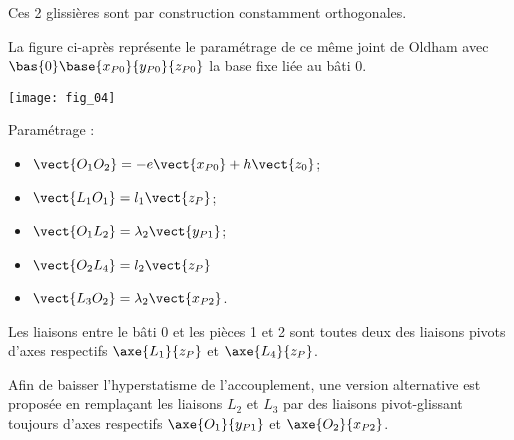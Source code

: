 \begin{multicols}{2}
\begin{multicols}{2}
Ces 2 glissières sont par construction constamment orthogonales.

La figure ci-après représente le paramétrage de ce même joint de Oldham avec $\bas{0}\base{x_{P0}}{y_{P0}}{z_{P0}}$ la base fixe liée au bâti 0.

\begin{center}%
\texttt{[image: fig\_04]}
\end{center}


Paramétrage :
\begin{itemize}
\item $\vect{O_1 O_2} =  - e\vect{x_{P0}} + h \vect{z_0}$;
\item $\vect{L_1 O_1 }=l_1 \vect{z_P}$;
\item $\vect{O_1 L_2 } =\lambda_2 \vect{y_{P1}}$;
\item $\vect{O_2 L_4 } =l_2 \vect{z_P}$
\item $\vect{L_3 O_2} = \lambda_2  \vect{x_{P2}}$.
\end{itemize}

Les liaisons entre le bâti 0 et les pièces 1 et 2 sont toutes deux des liaisons pivots d’axes respectifs
$\axe{L_1}{z_P}$ et $\axe{L_4}{z_P}$.






Afin de baisser l’hyperstatisme de l’accouplement, une version alternative est proposée en 
remplaçant les liaisons $L_2$ et $L_3$ par des liaisons pivot-glissant toujours d’axes respectifs
$\axe{O_1}{y_{P1}}$ et $\axe{O_2}{x_{P2}}$.




\end{multicols}
\end{multicols}

